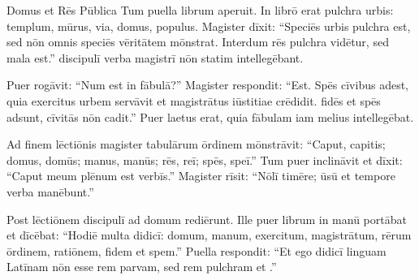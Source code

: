 \documentclass[12pt]{nextbook}
\begin{document}
\begin{readersection}{Domus et Rēs Pūblica}
Tum puella librum aperuit. In librō erat  pulchra urbis: templum, mūrus, via, domus, populus. Magister dīxit: “Speciēs urbis pulchra est, sed nōn omnis speciēs vēritātem mōnstrat. Interdum rēs pulchra vidētur, sed mala est.”  discipulī verba magistrī nōn statim intellegēbant.

Puer rogāvit: “Num est  in fābulā?” Magister respondit: “Est. Spēs cīvibus adest, quia exercitus urbem servāvit et magistrātus iūstitiae crēdidit.  fidēs et spēs adsunt, cīvitās nōn cadit.” Puer laetus erat, quia fābulam iam melius intellegēbat.

Ad finem lēctiōnis magister tabulārum ōrdinem mōnstrāvit: “Caput, capitis; domus, domūs; manus, manūs; rēs, reī; spēs, speī.” Tum puer  inclināvit et dīxit: “Caput meum plēnum est verbīs.” Magister rīsit: “Nōlī timēre; ūsū et tempore verba manēbunt.”

Post lēctiōnem discipulī ad domum rediērunt. Ille puer librum in manū portābat et dīcēbat: “Hodiē multa didicī: domum, manum, exercitum, magistrātum, rērum ōrdinem, ratiōnem, fidem et spem.” Puella respondit: “Et ego didicī linguam Latīnam nōn esse rem parvam, sed rem pulchram et .”

\end{readersection}
\end{document}
